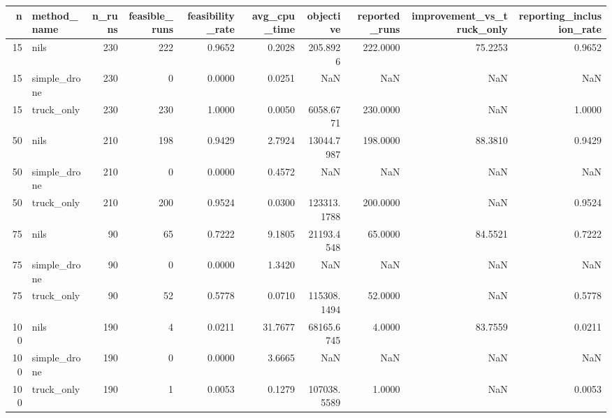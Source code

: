 \begin{tabular}{rlrrrrrrrr}
\toprule
n & method_name & n_runs & feasible_runs & feasibility_rate & avg_cpu_time & objective & reported_runs & improvement_vs_truck_only & reporting_inclusion_rate \\
\midrule
15 & nils & 230 & 222 & 0.9652 & 0.2028 & 205.8926 & 222.0000 & 75.2253 & 0.9652 \\
15 & simple_drone & 230 & 0 & 0.0000 & 0.0251 & NaN & NaN & NaN & NaN \\
15 & truck_only & 230 & 230 & 1.0000 & 0.0050 & 6058.6771 & 230.0000 & NaN & 1.0000 \\
50 & nils & 210 & 198 & 0.9429 & 2.7924 & 13044.7987 & 198.0000 & 88.3810 & 0.9429 \\
50 & simple_drone & 210 & 0 & 0.0000 & 0.4572 & NaN & NaN & NaN & NaN \\
50 & truck_only & 210 & 200 & 0.9524 & 0.0300 & 123313.1788 & 200.0000 & NaN & 0.9524 \\
75 & nils & 90 & 65 & 0.7222 & 9.1805 & 21193.4548 & 65.0000 & 84.5521 & 0.7222 \\
75 & simple_drone & 90 & 0 & 0.0000 & 1.3420 & NaN & NaN & NaN & NaN \\
75 & truck_only & 90 & 52 & 0.5778 & 0.0710 & 115308.1494 & 52.0000 & NaN & 0.5778 \\
100 & nils & 190 & 4 & 0.0211 & 31.7677 & 68165.6745 & 4.0000 & 83.7559 & 0.0211 \\
100 & simple_drone & 190 & 0 & 0.0000 & 3.6665 & NaN & NaN & NaN & NaN \\
100 & truck_only & 190 & 1 & 0.0053 & 0.1279 & 107038.5589 & 1.0000 & NaN & 0.0053 \\
\bottomrule
\end{tabular}
